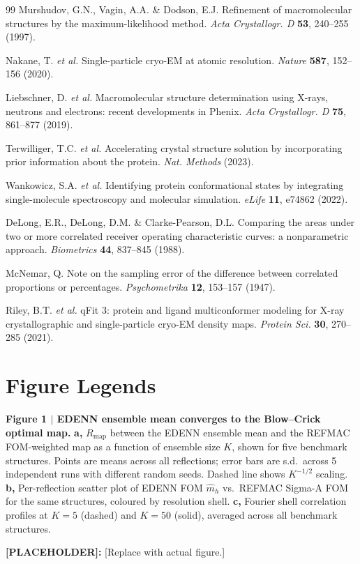 \documentclass[10pt,twocolumn]{article}
\newcommand{\placeholder}[1]{%
  \begin{mdframed}[
    linecolor=placeholder,linewidth=1pt,
    backgroundcolor=red!5,
    innertopmargin=6pt,innerbottommargin=6pt,
    innerleftmargin=8pt,innerrightmargin=8pt]
  \small\color{placeholder}\textbf{[PLACEHOLDER]:} #1
  \end{mdframed}
}
\begin{document}
\begin{thebibliography}{99}
Murshudov, G.N., Vagin, A.A. \& Dodson, E.J.
Refinement of macromolecular structures by the
maximum-likelihood method.
\textit{Acta Crystallogr. D} \textbf{53}, 240--255 (1997).

Nakane, T. \textit{et al.}
Single-particle cryo-EM at atomic resolution.
\textit{Nature} \textbf{587}, 152--156 (2020).

Liebschner, D. \textit{et al.}
Macromolecular structure determination using X-rays, neutrons
and electrons: recent developments in Phenix.
\textit{Acta Crystallogr. D} \textbf{75}, 861--877 (2019).

Terwilliger, T.C. \textit{et al.}
Accelerating crystal structure solution by incorporating
prior information about the protein.
\textit{Nat. Methods} (2023).

Wankowicz, S.A. \textit{et al.}
Identifying protein conformational states by integrating
single-molecule spectroscopy and molecular simulation.
\textit{eLife} \textbf{11}, e74862 (2022).

DeLong, E.R., DeLong, D.M. \& Clarke-Pearson, D.L.
Comparing the areas under two or more correlated receiver
operating characteristic curves: a nonparametric approach.
\textit{Biometrics} \textbf{44}, 837--845 (1988).

McNemar, Q.
Note on the sampling error of the difference between correlated
proportions or percentages.
\textit{Psychometrika} \textbf{12}, 153--157 (1947).

Riley, B.T. \textit{et al.}
qFit 3: protein and ligand multiconformer modeling for X-ray
crystallographic and single-particle cryo-EM density maps.
\textit{Protein Sci.} \textbf{30}, 270--285 (2021).

\end{thebibliography}

\onecolumn
\section*{Figure Legends}

\noindent\textbf{Figure 1 $|$ EDENN ensemble mean converges to the
Blow--Crick optimal map.}
\textbf{a,} $R_{\mathrm{map}}$ between the EDENN ensemble mean and
the REFMAC FOM-weighted map as a function of ensemble size $K$,
shown for five benchmark structures.
Points are means across all reflections; error bars are s.d.\
across 5 independent runs with different random seeds.
Dashed line shows $K^{-1/2}$ scaling.
\textbf{b,} Per-reflection scatter plot of EDENN FOM $\hat m_h$
vs.\ REFMAC Sigma-A FOM for the same structures, coloured by
resolution shell.
\textbf{c,} Fourier shell correlation profiles at $K=5$ (dashed)
and $K=50$ (solid), averaged across all benchmark structures.
\placeholder{[Replace with actual figure.]}
\end{document}
